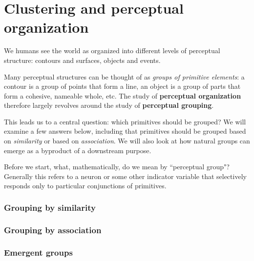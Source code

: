\chapter{Clustering and perceptual organization}

We humans see the world as organized into different levels of perceptual structure: contours and surfaces, objects and events. 

Many perceptual structures can be thought of as \textit{groups of primitive elements}: a contour is a group of points that form a line, an object is a group of parts that form a cohesive, nameable whole, etc. The study of \textbf{perceptual organization} therefore largely revolves around the study of \textbf{perceptual grouping}.

This leads us to a central question: which primitives should be grouped? We will examine a few answers below, including that primitives should be grouped based on \textit{similarity} or based on \textit{association}. We will also look at how natural groups can emerge as a byproduct of a downstream purpose.

Before we start, what, mathematically, do we mean by ``perceptual group"? Generally this refers to a neuron or some other indicator variable that selectively responds only to particular conjunctions of primitives.

\subsection{Grouping by similarity}


\subsection{Grouping by association}


\subsection{Emergent groups}